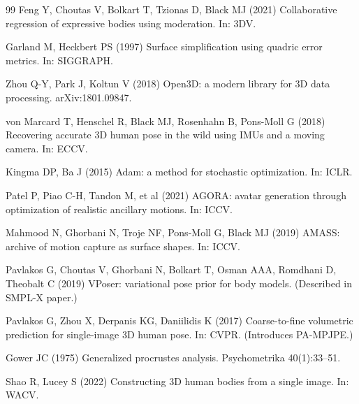 \documentclass[twocolumn,10pt]{svjour3}
\begin{document}
\begin{thebibliography}{99}
Feng Y, Choutas V, Bolkart T, Tzionas D, Black MJ (2021) Collaborative regression of expressive bodies using moderation. In: 3DV.

Garland M, Heckbert PS (1997) Surface simplification using quadric error metrics. In: SIGGRAPH.

Zhou Q-Y, Park J, Koltun V (2018) Open3D: a modern library for 3D data processing. arXiv:1801.09847.

von Marcard T, Henschel R, Black MJ, Rosenhahn B, Pons-Moll G (2018) Recovering accurate 3D human pose in the wild using IMUs and a moving camera. In: ECCV.

Kingma DP, Ba J (2015) Adam: a method for stochastic optimization. In: ICLR.

Patel P, Piao C-H, Tandon M, et al (2021) AGORA: avatar generation through optimization of realistic ancillary motions. In: ICCV.

Mahmood N, Ghorbani N, Troje NF, Pons-Moll G, Black MJ (2019) AMASS: archive of motion capture as surface shapes. In: ICCV.

Pavlakos G, Choutas V, Ghorbani N, Bolkart T, Osman AAA, Romdhani D, Theobalt C (2019) VPoser: variational pose prior for body models. (Described in SMPL-X paper.)

Pavlakos G, Zhou X, Derpanis KG, Daniilidis K (2017) Coarse-to-fine volumetric prediction for single-image 3D human pose. In: CVPR. (Introduces PA-MPJPE.)

Gower JC (1975) Generalized procrustes analysis. Psychometrika 40(1):33--51.

Shao R, Lucey S (2022) Constructing 3D human bodies from a single image. In: WACV.
\end{thebibliography}
\end{document}
